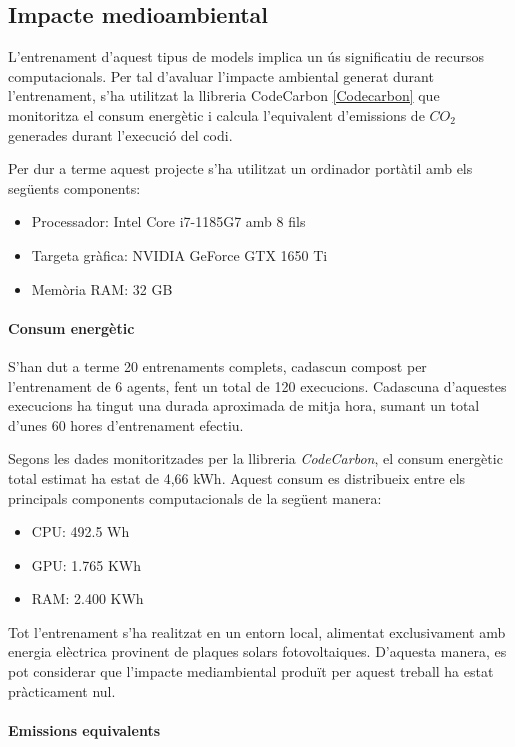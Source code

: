 \documentclass[12pt,a4paper,twoside]{book}
\begin{document}
\subsection{Impacte medioambiental}

L'entrenament d'aquest tipus de models implica un ús significatiu de recursos computacionals. Per tal d'avaluar
l'impacte ambiental generat durant l'entrenament, s'ha utilitzat la llibreria CodeCarbon \ref{Codecarbon} que monitoritza el consum energètic i calcula l'equivalent d'emissions de $CO_2$ generades durant l'execució del codi.

Per dur a terme aquest projecte s'ha utilitzat un ordinador portàtil amb els següents components:
\begin{itemize}
    \item Processador: Intel Core i7-1185G7 amb 8 fils
    \item Targeta gràfica: NVIDIA GeForce GTX 1650 Ti
    \item Memòria RAM: 32 GB
\end{itemize}

\paragraph{Consum energètic}

S'han dut a terme 20 entrenaments complets, cadascun compost per l'entrenament de 6 agents, fent un total de 120 execucions. Cadascuna d'aquestes execucions ha tingut una durada aproximada de mitja hora, sumant un total d'unes 60 hores d'entrenament efectiu.

Segons les dades monitoritzades per la llibreria \textit{CodeCarbon}, el consum energètic total estimat ha estat de 4,66 kWh. Aquest consum es distribueix entre els principals components computacionals de la següent manera:

\begin{itemize}
    \item CPU: 492.5 Wh
    \item GPU: 1.765 KWh
    \item RAM: 2.400 KWh
\end{itemize}

Tot l'entrenament s'ha realitzat en un entorn local, alimentat exclusivament amb energia elèctrica provinent de plaques solars fotovoltaiques. D'aquesta manera, es pot considerar que l'impacte mediambiental produït per aquest treball ha estat pràcticament nul.

\paragraph{Emissions equivalents}
\end{document}
